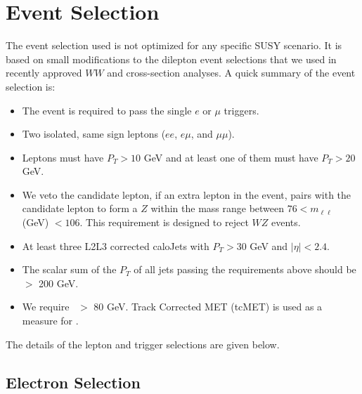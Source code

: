 \section{Event Selection}
\label{sec:eventselection}

The event selection used is not optimized for any specific SUSY scenario.
It is based on small modifications to the dilepton event selections 
that we used in recently approved 
$WW$\cite{ww} and \ttbar\cite{ttbar} cross-section
analyses.  A quick summary of the event selection is:
\begin{itemize}
\item The event is required to pass the single $e$ or $\mu$  triggers.
\item Two isolated, same sign leptons ($ee$, $e\mu$, and $\mu\mu$). 
\item Leptons must have $P_T > 10$ GeV and at least one of them must have $P_T > 20$ GeV.
\item We veto the candidate lepton, if an extra lepton in the event, pairs with the candidate lepton
to form a $Z$ within the mass range between $76 < m_{\ell\ell} $ (GeV) $< 106$. This requirement is 
designed to reject $WZ$ events.
\item At least three L2L3 corrected caloJets with $P_T > 30$ GeV and $|\eta|< 2.4$.
\item The scalar sum of the $P_T$ of all jets passing the requirements above should be $>$ 200 GeV.
\item We require \met~$>$ 80 GeV. Track Corrected MET (tcMET) \cite{tcmet} is used as a measure for \met.
\end{itemize}
\noindent The details of the lepton and trigger selections are given below.

\subsection{Electron Selection}
\label{sec:electron}

